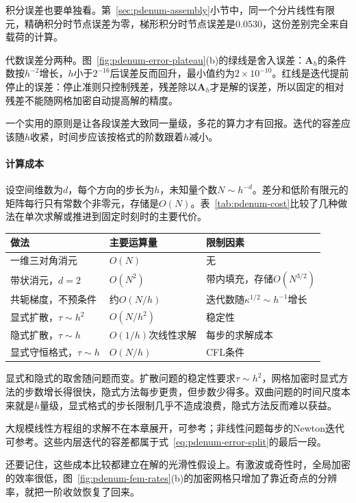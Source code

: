 积分误差也要单独看。第~\ref{sec:pdenum-assembly}小节中，同一个分片线性有限元，精确积分时节点误差为零，梯形积分时节点误差是$0.0530$，这份差别完全来自载荷的计算。

代数误差分两种。图~\ref{fig:pdenum-error-plateau}(b)的绿线是舍入误差：$\bm{A}_h$的条件数按$h^{-2}$增长，$h$小于$2^{-16}$后误差反而回升，最小值约为$2\times10^{-10}$。红线是迭代提前停止的误差：停止准则只控制残差，残差除以$\bm{A}_h$才是解的误差，所以固定的相对残差不能随网格加密自动提高解的精度。

一个实用的原则是让各段误差大致同一量级，多花的算力才有回报。迭代的容差应该随$h$收紧，时间步应该按格式的阶数跟着$h$减小。

\paragraph{计算成本}
设空间维数为$d$，每个方向的步长为$h$，未知量个数$N\sim h^{-d}$。差分和低阶有限元的矩阵每行只有常数个非零元，存储是$O(N)$。表~\ref{tab:pdenum-cost}比较了几种做法在单次求解或推进到固定时刻时的主要代价。

\begin{BookInlineTable}
 \centering
 \caption{$N\sim h^{-d}$个未知量时的代表性成本，$T$固定，常数和对数因子未写出。}
 \label{tab:pdenum-cost}
 \begin{tabular}{p{32mm}p{28mm}p{36mm}}
  \toprule
  做法 & 主要运算量 & 限制因素\\
  \midrule
  一维三对角消元 & $O(N)$ & 无\\
  带状消元，$d=2$ & $O(N^{2})$ & 带内填充，存储$O(N^{3/2})$\\
  共轭梯度，不预条件 & 约$O(N/h)$ & 迭代数随$\kappa^{1/2}\sim h^{-1}$增长\\
  显式扩散，$\tau\sim h^2$ & $O(N/h^2)$ & 稳定性\\
  隐式扩散，$\tau\sim h$ & $O(1/h)$次线性求解 & 每步的求解成本\\
  显式守恒格式，$\tau\sim h$ & $O(N/h)$ & CFL条件\\
  \bottomrule
 \end{tabular}
\end{BookInlineTable}

显式和隐式的取舍随问题而变。扩散问题的稳定性要求$\tau\sim h^2$，网格加密时显式方法的步数增长得很快，隐式方法每步更贵，但步数少得多。双曲问题的时间尺度本来就是$h$量级，显式格式的步长限制几乎不造成浪费，隐式方法反而难以获益。

大规模线性方程组的求解不在本章展开，可参考；非线性问题每步的Newton迭代可参考。这些内层迭代的容差都属于式~\eqref{eq:pdenum-error-split}的最后一段。

还要记住，这些成本比较都建立在解的光滑性假设上。有激波或奇性时，全局加密的效率很低，图~\ref{fig:pdenum-fem-rates}(b)的加密网格只增加了靠近奇点的分辨率，就把一阶收敛恢复了回来。
